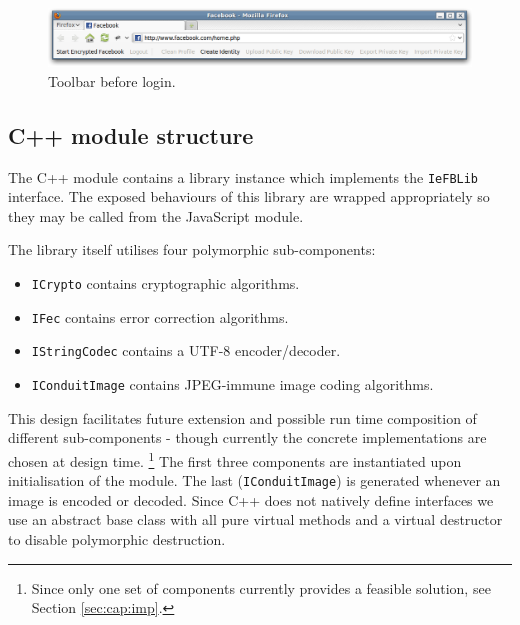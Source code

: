         \begin{figure}[tbph]
        \begin{center}
                \includegraphics[width=12cm]{screens/toolbar.png}
            \caption{Toolbar before login.}
            \label{scn:toolbar}
        \end{center}
    \end{figure}
    

\subsection{C++ module structure}
\label{sec:modstruct}

    The C++ module contains a library instance which implements the {\tt IeFBLib} interface. The exposed behaviours of this library are wrapped appropriately so they may be called from the JavaScript module.
    
    The library itself utilises four polymorphic sub-components:
    
    \begin{itemize}
    
        \item {\tt ICrypto} contains cryptographic algorithms.
        \item {\tt IFec} contains error correction algorithms.
        \item {\tt IStringCodec} contains a UTF-8 encoder/decoder.
        \item {\tt IConduitImage} contains JPEG-immune image coding algorithms.
    
    \end{itemize}
    
    This design facilitates future extension and possible run time composition of different sub-components - though currently the concrete implementations are chosen at design time. \footnote{Since only one set of components currently provides a feasible solution, see Section \ref{sec:cap:imp}.} The first three components are instantiated upon initialisation of the module. The last ({\tt IConduitImage}) is generated whenever an image is encoded or decoded. Since C++ does not natively define interfaces we use an abstract base class with all pure virtual methods and a virtual destructor to disable polymorphic destruction.
    
